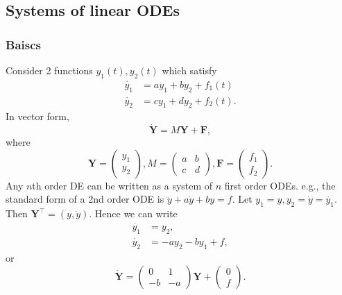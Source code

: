 \documentclass[a4paper]{article}
\begin{document}
      \subsection{Systems of linear ODEs}
      \subsubsection{Baiscs}
      Consider 2 functions $y_1(t),y_2(t)$ which satisfy 
      \begin{align*}
        \dot{y_1} &= a y_1+by_2+f_1(t)\\
        \dot{y_2}&= cy_1+dy_2+f_2(t).
      \end{align*}
      In vector form,
      \[
          \dot{\mathbf{Y}} = M\mathbf{Y}+\mathbf{F},
      \]
      where 
      \[
          \mathbf{Y} = \begin{pmatrix}
            y_1\\y_2
          \end{pmatrix},M=\begin{pmatrix}
              a&b\\
              c&d
          \end{pmatrix}, \mathbf{F} = \begin{pmatrix}
            f_1\\f_2
          \end{pmatrix}.
      \]
      Any $n$th order DE can be written as a system of $n$ first order ODEs. e.g., the standard form of a 2nd order ODE is $ \ddot{y}+a \dot{y}+by=f $. Let $y_1=y, y_2=\dot{y}=\dot{y_1}$. Then $ \mathbf{Y}^{\top}=(y,\dot{y}) $. Hence we can write 
      \begin{align*}
          \dot{y_1}&= y_2,\\
          \dot{y_2}&= -ay_2-by_1+f,
      \end{align*} 
      or
      \[
          \dot{\mathbf{Y}}=\begin{pmatrix}
              0&1\\
              -b&-a
          \end{pmatrix}\mathbf{Y}+\begin{pmatrix}
              0\\f
          \end{pmatrix}.
      \]
\end{document}
